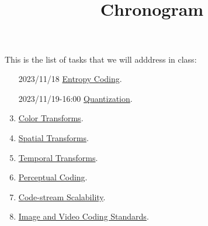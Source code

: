 

\title{\SM{} \\ Chronogram}

\maketitle

This is the list of tasks that we will adddress in class:

\begin{enumerate}
\item [2023/11/18] \href{https://sistemas-multimedia.github.io/contents/entropy_coding/#x1-110007}{Entropy Coding}.
\item [2023/11/19-16:00] \href{https://sistemas-multimedia.github.io/contents/quantization/#x1-150008}{Quantization}.
\item \href{https://sistemas-multimedia.github.io/contents/color_transforms/#x1-100006}{Color Transforms}.
\item \href{https://sistemas-multimedia.github.io/contents/spatial_transforms/#x1-80006}{Spatial Transforms}.
\item \href{https://sistemas-multimedia.github.io/contents/temporal_transforms/#x1-90008}{Temporal Transforms}.
\item \href{https://sistemas-multimedia.github.io/contents/perceptual_coding/#x1-100009}{Perceptual Coding}.
\item \href{https://sistemas-multimedia.github.io/contents/data_scalability/#x1-150008}{Code-stream Scalability}.
\item \href{https://sistemas-multimedia.github.io/contents/standards/#x1-40003}{Image and Video Coding Standards}.
\end{enumerate}
